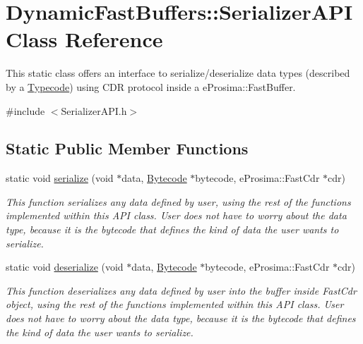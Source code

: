 \hypertarget{class_dynamic_fast_buffers_1_1_serializer_a_p_i}{\section{Dynamic\-Fast\-Buffers\-:\-:Serializer\-A\-P\-I Class Reference}
\label{class_dynamic_fast_buffers_1_1_serializer_a_p_i}
}


This static class offers an interface to serialize/deserialize data types (described by a \hyperlink{class_dynamic_fast_buffers_1_1_typecode}{Typecode}) using C\-D\-R protocol inside a e\-Prosima\-::\-Fast\-Buffer.  




{\ttfamily \#include $<$Serializer\-A\-P\-I.\-h$>$}

\subsection*{Static Public Member Functions}
\begin{DoxyCompactItemize}
\item 
static void \hyperlink{class_dynamic_fast_buffers_1_1_serializer_a_p_i_ac9c1550caf7377448084cc966204b896}{serialize} (void $\ast$data, \hyperlink{class_dynamic_fast_buffers_1_1_bytecode}{Bytecode} $\ast$bytecode, e\-Prosima\-::\-Fast\-Cdr $\ast$cdr)
\begin{DoxyCompactList}\small\item\em This function serializes any data defined by user, using the rest of the functions implemented within this A\-P\-I class. User does not have to worry about the data type, because it is the bytecode that defines the kind of data the user wants to serialize. \end{DoxyCompactList}\item 
static void \hyperlink{class_dynamic_fast_buffers_1_1_serializer_a_p_i_abeb9a50eae218edb44e82dcde232d0d7}{deserialize} (void $\ast$data, \hyperlink{class_dynamic_fast_buffers_1_1_bytecode}{Bytecode} $\ast$bytecode, e\-Prosima\-::\-Fast\-Cdr $\ast$cdr)
\begin{DoxyCompactList}\small\item\em This function deserializes any data defined by user into the buffer inside Fast\-Cdr object, using the rest of the functions implemented within this A\-P\-I class. User does not have to worry about the data type, because it is the bytecode that defines the kind of data the user wants to serialize. \end{DoxyCompactList}\end{DoxyCompactItemize}
